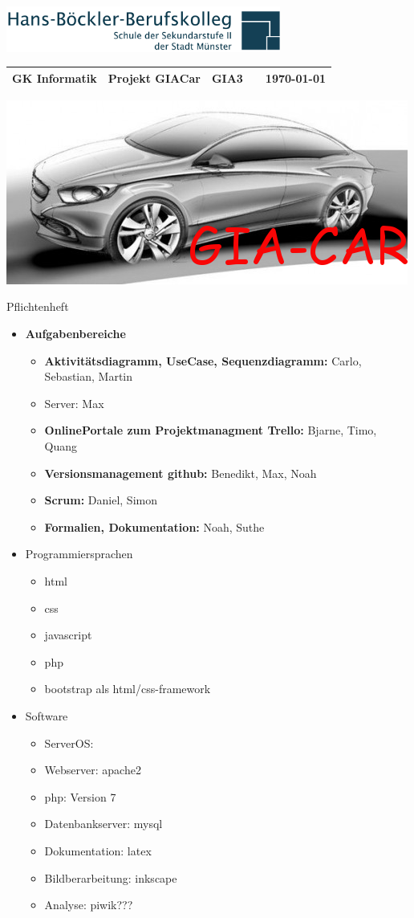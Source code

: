 \documentclass[11pt,a4paper]{letter}
\begin{document}
\raggedleft\includegraphics[height=1.5cm]{images/hbbk-logo.png}
\\
\begin{tabular}{p{4cm} p{5cm} p{1.5cm} p{1.5cm} p{3cm}}
  \tabularnewline
  \textbf{GK Informatik} & \textbf{Projekt GIACar}    & GIA3    &  & {\today} \tabularnewline 
  \hline
\end{tabular}


\centering
\includegraphics[width=0.7\linewidth]{./images/GIAcar}

\centering\Huge{Pflichtenheft} \\

\normalsize
\begin{itemize}
\item \textbf{Aufgabenbereiche}
	\begin{itemize}
	\item \textbf{Aktivitätsdiagramm, UseCase, Sequenzdiagramm:} Carlo, Sebastian, Martin
	\item Server: Max
	\item \textbf{OnlinePortale zum Projektmanagment Trello:} Bjarne, Timo, Quang
	\item \textbf{Versionsmanagement github:} Benedikt, Max, Noah
	\item \textbf{Scrum:} Daniel, Simon
	\item \textbf{Formalien, Dokumentation:} Noah, Suthe
	\end{itemize}
\item Programmiersprachen
\begin{itemize}
\item html
\item css
\item javascript
\item php
\item bootstrap als html/css-framework
\end{itemize}
\item Software
\begin{itemize}
\item ServerOS: 
\item Webserver: apache2
\item php: Version 7
\item Datenbankserver: mysql
\item Dokumentation: latex
\item Bildberarbeitung: inkscape 
\item Analyse: piwik???
\end{itemize}
\end{itemize}
\end{document}
